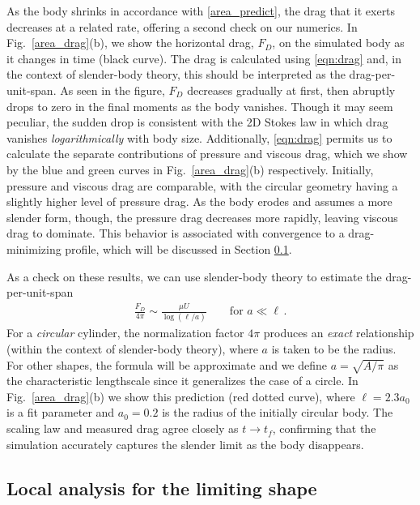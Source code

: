 \documentclass[preprint, 10pt]{elsarticle}
\begin{document}
	As the body shrinks in accordance with \eqref{area_predict}, the drag that it exerts decreases at a related rate, offering a second check on our numerics. In Fig.~\ref{area_drag}(b), we show the horizontal drag, $F_D$, on the simulated body as it changes in time (black curve). The drag is calculated using \eqref{eqn:drag} and, in the context of slender-body theory, this should be interpreted as the drag-per-unit-span. As seen in the figure, $F_D$ decreases gradually at first, then abruptly drops to zero in the final moments as the body vanishes. Though it may seem peculiar, the sudden drop is consistent with the 2D Stokes law in which drag vanishes {\em logarithmically} with body size. Additionally, \eqref{eqn:drag} permits us to calculate the separate contributions of pressure and viscous drag, which we show by the blue and green curves in Fig.~\ref{area_drag}(b) respectively. Initially, pressure and viscous drag are comparable, with the circular geometry having a slightly higher level of pressure drag. As the body erodes and assumes a more slender form, though, the pressure drag decreases more rapidly, leaving viscous drag to dominate. This behavior is associated with convergence to a drag-minimizing profile, which will be discussed in Section \ref{LimitingShape}.

As a check on these results, we can use slender-body theory to estimate the drag-per-unit-span
\begin{align}
\label{dragscaling}
\frac{F_D}{4 \pi} \sim \frac{ \mu U}{\log(\ell/a)}	\qquad \text{for } a \ll \ell \, .
\end{align}
For a {\em circular} cylinder, the normalization factor $4 \pi$ produces an {\em exact} relationship (within the context of slender-body theory), where $a$ is taken to be the radius. For other shapes, the formula will be approximate and we define $a = \sqrt{A/\pi}$ as the characteristic lengthscale since it generalizes the case of a circle. In Fig.~\ref{area_drag}(b) we show this prediction (red dotted curve), where $\ell = 2.3 a_0$ is a fit parameter and $a_0 = 0.2$ is the radius of the initially circular body. The scaling law and measured drag agree closely as $t \to t_f$, confirming that the simulation accurately captures the slender limit as the body disappears.


\subsection{Local analysis for the limiting shape}
\label{LimitingShape}
 
\end{document}
